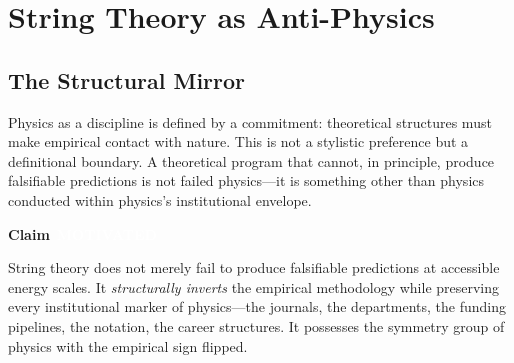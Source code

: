 \documentclass[11pt,letterpaper]{article}
\newcommand{\motivated}{\texorpdfstring{\colorbox{motivated}{\textcolor{white}{\scriptsize\textbf{\,MOTIVATED\,}}}}{ [MOTIVATED]}}
\newenvironment{claim}[1]{%
  \par\medskip\noindent\textbf{Claim} #1\quad\itshape
}{%
  \par\medskip
}
\newcommand{\OO}{\mathbb{O}}
\newcommand{\hthreeO}{\mathfrak{h}_3(\OO)}
\begin{document}

\begin{abstract}
This thesis advances a unified argument across five interconnected claims. First, that string theory functions as \emph{anti-physics}---not merely non-empirical but structurally opposed to empirical methodology while occupying its institutional space. Second, that this structural inversion arises from a specific algebraic avoidance: the refusal to inhabit non-associative algebra, particularly the octonions, which produces compensatory overdimensionality. Third, that the Albert algebra $\hthreeO$ provides the native 27-dimensional structure that string theory approximates at the cost of unexplained surplus dimensions. Fourth, that Majorana zero modes are not a single quasiparticle to be detected but a \emph{type constructor}---a topological prefix that systematically transforms quasiparticle excitations across the tenfold way classification. Fifth, that formal verification in dependent type theory is the native language for expressing and resolving these structures, and that the Geometry of State codebase constitutes a working demonstration of this claim.
\end{abstract}


\section{String Theory as Anti-Physics}

\subsection{The Structural Mirror}

Physics as a discipline is defined by a commitment: theoretical structures must make empirical contact with nature. This is not a stylistic preference but a definitional boundary. A theoretical program that cannot, in principle, produce falsifiable predictions is not failed physics---it is something other than physics conducted within physics's institutional envelope.

\begin{claim}{\motivated}
String theory does not merely fail to produce falsifiable predictions at accessible energy scales. It \emph{structurally inverts} the empirical methodology while preserving every institutional marker of physics---the journals, the departments, the funding pipelines, the notation, the career structures. It possesses the symmetry group of physics with the empirical sign flipped.
\end{claim}
\end{document}
